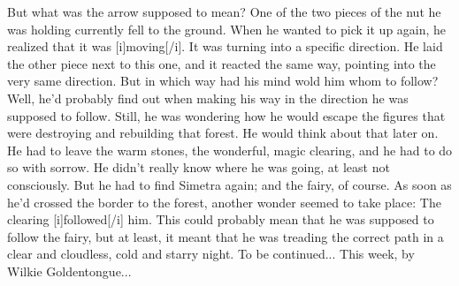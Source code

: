 But what was the arrow supposed to mean? 
One of the two pieces of the nut he was holding currently fell to the ground. When he wanted to pick it up again, he realized that it was [i]moving[/i]. It was turning into a specific direction. He laid the other piece next to this one, and it reacted the same way, pointing into the very same direction. But in which way had his mind wold him whom to follow? 
Well, he'd probably find out when making his way in the direction he was supposed to follow. Still, he was wondering how he would escape the figures that were destroying and rebuilding that forest. He would think about that later on. 
He had to leave the warm stones, the wonderful, magic clearing, and he had to do so with sorrow. He didn't really know where he was going, at least not consciously. But he had to find Simetra again; and the fairy, of course. 
As soon as he'd crossed the border to the forest, another wonder seemed to take place: The clearing [i]followed[/i] him. This could probably mean that he was supposed to follow the fairy, but at least, it meant that he was treading the correct path in a clear and cloudless, cold and starry night. 
To be continued...
This week, by Wilkie Goldentongue...
